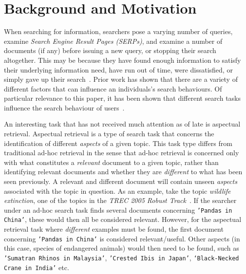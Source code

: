 \section{Background and Motivation} \label{sec:background}
When searching for information, searchers pose a varying number of queries, examine \emph{Search Engine Result Pages (SERPs)}, and examine a number of documents (if any) before issuing a new query, or stopping their search altogether. This may be because they have found enough information to satisfy their underlying information need, have run out of time, were dissatisfied, or simply gave up their search~\cite{diriye2012abandonment,dostert2009stopping_behaviours,hassan2013beyond_clicks,kiseleva2015serp_fails,prabha2007enough,zach2005stopping_behaviours}. Prior work has shown that there are a variety of different factors that can influence an individuals's search behaviours. Of particular relevance to this paper, it has been shown that different search tasks influence the search behaviour of users~\cite{kelly2015search_tasks}.

An interesting task that has not received much attention as of late is aspectual retrieval. Aspectual retrieval is a type of search task that concerns the identification of different \emph{aspects} of a given topic. This task type differs from traditional ad-hoc retrieval in the sense that ad-hoc retrieval is concerned only with what constitutes a \emph{relevant} document to a given topic, rather than identifying relevant documents and whether they are \emph{different} to what has been seen previously. A relevant and different document will contain unseen \emph{aspects} associated with the topic in question. As an example, take the topic \emph{wildlife extinction}, one of the topics in the \emph{TREC 2005 Robust Track}~\cite{voorhees2006trec_robust}. If the searcher under an ad-hoc search task finds several documents concerning \texttt{'Pandas in China'}, these would then all be considered relevant. However, for the aspectual retrieval task where \emph{different} examples must be found, the first document concerning \texttt{'Pandas in China'} is considered relevant/useful. Other aspects (in this case, species of endangered animals) would then need to be found, such as \texttt{'Sumatran Rhinos in Malaysia'}, \texttt{'Crested Ibis in Japan'}, \texttt{`Black-Necked Crane in India'} etc.

